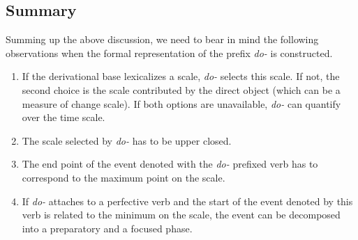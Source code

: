 \subsection{Summary}
Summing up the above discussion, we need to bear in mind the following observations when the formal representation of the prefix \textit{do-}   is constructed.
\begin{enumerate}
\item If the derivational base lexicalizes a scale, \textit{do-}   selects this scale. If not, the second choice is the scale contributed by the direct object (which can be a measure of change scale). If both options are unavailable, \textit{do-}   can quantify over the time scale.
\item The scale selected by \textit{do-}   has to be upper closed.
\item The end point of the event denoted with the \textit{do-}  prefixed verb has to correspond to the maximum point on the scale.
\item If \textit{do-}   attaches to a perfective verb  and the start of the event denoted by this verb is related to the minimum on the scale, the event can be decomposed into a preparatory and a focused phase.
\end{enumerate}


